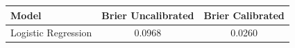 \begin{tabular}{lcc}
\hline
Model & Brier Uncalibrated & Brier Calibrated \\
\hline
Logistic Regression & 0.0968 & 0.0260 \\
\hline
\end{tabular}